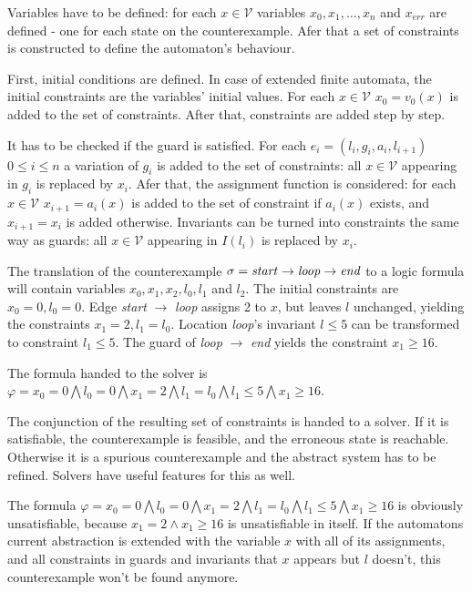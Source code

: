 Variables have to be defined: for each $x \in \mathcal{V}$ variables $x_0,x_1, \dots, x_n$ and $x_{err}$ are defined - one for each state on the counterexample. Afer that a set of constraints is constructed to define the automaton's behaviour. 

First, initial conditions are defined. In case of extended finite automata, the initial constraints are the variables' initial values. For each $x \in \mathcal{V}$ $x_0=v_0(x)$ is added to the set of constraints. After that, constraints are added step by step. 

It has to be checked if the guard is satisfied. For each $e_i=(l_i,g_i,a_i,l_{i+1})$ $0 \leq i \leq n$ a variation of $g_i$ is added to the set of constraints: all $x \in \mathcal{V}$ appearing in $g_i$ is replaced by $x_i$. Afer that, the assignment function is considered: for each $x \in \mathcal{V}$ $x_{i+1}=a_i(x)$ is added to the set of constraint if $a_i(x)$ exists, and $x_{i+1}=x_i$ is added otherwise. Invariants can be turned into constraints the same way as guards: all $x \in \mathcal{V}$ appearing in $I(l_i)$ is replaced by $x_i$. 

\begin{example}
	The translation of the counterexample $\sigma = \text{\emph{start}} \to \text{\emph{loop}} \to \text{\emph{end}}$ to a logic formula will contain variables $x_0,x_1,x_2,l_0,l_1$ and $l_2$. The initial constraints are $x_0=0,l_0=0$. Edge \emph{start} $\to$ \emph{loop} assigns 2 to $x$, but leaves $l$ unchanged, yielding the constraints $x_1=2,l_1=l_0$. Location \emph{loop}'s invariant $l \leq 5$ can be transformed to constraint $l_1 \leq 5$. The guard of \emph{loop} $\to$ \emph{end} yields the constraint $x_1 \geq 16$.
	
	The formula handed to the solver is $\varphi = x_0=0 \bigwedge l_0=0 \bigwedge x_1=2 \bigwedge l_1=l_0 \bigwedge l_1 \leq 5 \bigwedge x_1 \geq 16$.
\end{example}

The conjunction of the resulting set of constraints is handed to a solver. If it is satisfiable, the counterexample is feasible, and the erroneous state is reachable. Otherwise it is a spurious counterexample and the abstract system has to be refined. Solvers have useful features for this as well.

\begin{example}
	The formula $\varphi = x_0=0 \bigwedge l_0=0 \bigwedge x_1=2 \bigwedge l_1=l_0 \bigwedge l_1 \leq 5 \bigwedge x_1 \geq 16$ is obviously unsatisfiable, because $x_1=2 \wedge x_1 \geq 16$ is unsatisfiable in itself. If the automatons current abstraction is extended with the variable $x$ with all of its assignments, and all constraints in guards and invariants that $x$ appears but $l$ doesn't, this counterexample won't be found anymore.
\end{example}


